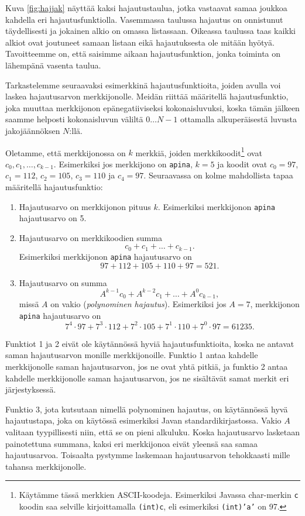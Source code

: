 Kuva \ref{fig:hajjak} näyttää kaksi hajautustaulua, jotka vastaavat
samaa joukkoa kahdella eri hajautusfunktiolla.
Vasemmassa taulussa hajautus on onnistunut täydellisesti
ja jokainen alkio on omassa listassaan.
Oikeassa taulussa taas kaikki alkiot ovat joutuneet samaan
listaan eikä hajautuksesta ole mitään hyötyä.
Tavoitteemme on, että saisimme aikaan hajautusfunktion,
jonka toiminta on lähempänä vasenta taulua.

Tarkastelemme seuraavaksi esimerkkinä hajautusfunktioita,
joiden avulla voi laskea hajautusarvon merkkijonolle.
Meidän riittää määritellä hajautusfunktio,
joka muuttaa merkkijonon epänegatiiviseksi kokonaisluvuksi,
koska tämän jälkeen saamme helposti kokonaisluvun
väliltä $0 \dots N-1$ ottamalla alkuperäisestä luvusta jakojäännöksen $N$:llä.

Oletamme, että merkkijonossa on $k$ merkkiä,
joiden merkkikoodit\footnote{Käytämme tässä merkkien ASCII-koodeja.
Esimerkiksi Javassa char-merkin \texttt{c} koodin saa
selville kirjoittamalla \texttt{(int)c}, eli esimerkiksi
\texttt{(int)'a'} on 97.} ovat $c_0,c_1,\dots,c_{k-1}$.
Esimerkiksi jos merkkijono on \texttt{apina},
$k=5$ ja koodit ovat $c_0=97$, $c_1=112$, $c_2=105$,
$c_3=110$ ja $c_4=97$.
Seuraavassa on kolme mahdollista tapaa määritellä hajautusfunktio:

\begin{enumerate}
\item Hajautusarvo on merkkijonon pituus $k$.
Esimerkiksi merkkijonon \texttt{apina} hajautusarvo on 5.
\item Hajautusarvo on merkkikoodien summa
\[ c_0 + c_1 + \dots + c_{k-1}.\]
Esimerkiksi merkkijonon \texttt{apina} hajautusarvo on
\[97+112+105+110+97=521.\]
\item Hajautusarvo on summa
\[ A^{k-1} c_0 + A^{k-2} c_1 + \dots + A^0 c_{k-1},\]
missä $A$ on vakio (\emph{polynominen hajautus}).
Esimerkiksi jos $A=7$, merkkijonon \texttt{apina} hajautusarvo on
\[7^4 \cdot 97+7^3 \cdot 112+7^2 \cdot 105+7^1 \cdot 110+7^0 \cdot 97=61235.\]
\end{enumerate}

Funktiot 1 ja 2 eivät ole käytännössä hyviä hajautusfunktioita,
koska ne antavat saman hajautusarvon monille merkkijonoille.
Funktio 1 antaa kahdelle merkkijonolle saman hajautusarvon,
jos ne ovat yhtä pitkiä,
ja funktio 2 antaa kahdelle merkkijonolle saman hajautusarvon,
jos ne sisältävät samat merkit eri järjestyksessä.

Funktio 3, jota kutsutaan nimellä polynominen hajautus,
on käytännössä hyvä hajautustapa, joka on käytössä esimerkiksi
Javan standardikirjastossa.
Vakio $A$ valitaan tyypillisesti niin, että se on pieni alkuluku.
Koska hajautusarvo lasketaan painotettuna summana,
kaksi eri merkkijonoa eivät yleensä saa samaa hajautusarvoa.
Toisaalta pystymme laskemaan hajautusarvon tehokkaasti
mille tahansa merkkijonolle.

